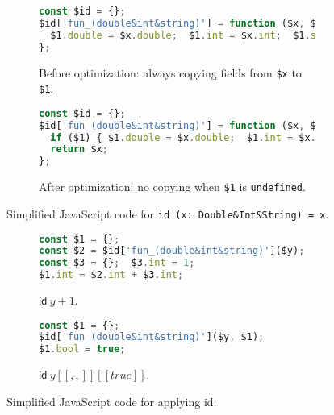 \begin{figure}
\begin{subfigure}{\textwidth}
\begin{lstlisting}[language=TypeScript,deletekeywords=string]
const $id = {};
$id['fun_(double&int&string)'] = function ($x, $1) {
  $1.double = $x.double;  $1.int = $x.int;  $1.string = $x.string;
};
\end{lstlisting}
\caption{Before optimization: always copying fields from \lstinline{$x} to \lstinline{$1}.}
\label{fig:id-before}
\end{subfigure}
\par\bigskip
\begin{subfigure}{\textwidth}
\begin{lstlisting}[language=TypeScript,deletekeywords=string]
const $id = {};
$id['fun_(double&int&string)'] = function ($x, $1) {
  if ($1) { $1.double = $x.double;  $1.int = $x.int;  $1.string = $x.string; }
  return $x;
};
\end{lstlisting}
\caption{After optimization: no copying when \lstinline{$1} is \lstinline{undefined}.}
\label{fig:id-after}
\end{subfigure}
\caption{Simplified JavaScript code for \lstinline{id (x: Double&Int&String) = x}.}
\label{fig:id-before-after}
\end{figure}

\begin{figure}
\begin{subfigure}{.55\textwidth}
\begin{lstlisting}[language=TypeScript,deletekeywords=string]
const $1 = {};
const $2 = $id['fun_(double&int&string)']($y);
const $3 = {};  $3.int = 1;
$1.int = $2.int + $3.int;
\end{lstlisting}
\caption{$\textsf{id}\ y + 1$.} \label{fig:id-plus}
\end{subfigure}%
\begin{subfigure}{.45\textwidth}
\begin{lstlisting}[language=TypeScript,deletekeywords=string]
const $1 = {};
$id['fun_(double&int&string)']($y, $1);
$1.bool = true;
\end{lstlisting}
\caption{$\textsf{id}\ y[[,,]][[true]]$.} \label{fig:id-merge}
\end{subfigure}
\caption{Simplified JavaScript code for applying \textsf{id}.}
\label{fig:id-plus-merge}
\end{figure}

